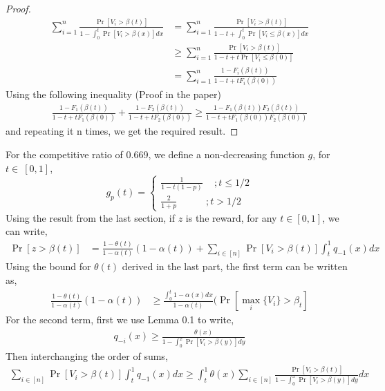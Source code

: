 \documentclass[10pt, letterpaper, twoside]{article}
\begin{document}
	\begin{proof}
		\begin{align*}
			\sum_{i=1}^{n} \frac{\Pr[V_{i}>\beta(t)]}{1-\int_{0}^{t} \Pr[V_{i}>\beta(x)] dx} &= \sum_{i=1}^{n} \frac{\Pr[V_{i}>\beta(t)]}{1-t+\int_{0}^{t} \Pr[V_{i}\leq\beta(x)] dx}\\
			&\geq \sum_{i=1}^{n} \frac{\Pr[V_{i}>\beta(t)]}{1-t+t\Pr[V_{i}\leq\beta(0)]}\\
			&=\sum_{i=1}^{n} \frac{1-F_{i}(\beta(t))}{1-t+tF_{i}(\beta(0))}
		\end{align*}
		Using the following inequality	 (Proof in the paper)
		\begin{align*} 
			\frac{1-F_{1}(\beta(t))}{1-t+tF_{1}(\beta(0))} + \frac{1-F_{2}(\beta(t))}{1-t+tF_{2}(\beta(0))} \geq \frac{1-F_{1}(\beta(t))F_{2}(\beta(t))}{1-t+tF_{1}(\beta(0))F_{2}(\beta(0))} 
		\end{align*}  
		and repeating it n times, we get the required result.
	\end{proof}
	For the competitive ratio of 0.669, we define a non-decreasing function $g$, for $t \in\ [0,1]$,
	$$g_{p}(t) = \begin{cases}
	\frac{1}{1-t(1-p)}  \quad \,; t \leq 1/2 \\
	\frac{2}{1+p} \quad \quad \quad; t > 1/2
	\end{cases}
	$$
	Using the result from the last section, if $z$ is the reward, for any $t \in [0,1]$, we can write,\\
	\begin{align*}
		\Pr[z > \beta(t)] &= \frac{1-\theta(t)}{1-\alpha(t)} (1-\alpha(t)) + \sum_{i \in [n]} \Pr[V_{i} > \beta(t)] \int_{t}^{1} q_{-1}(x) dx
	\end{align*}
	Using the bound for $\theta(t)$ derived in the last part, the first term can be written as,
	\begin{align*}
		\frac{1-\theta(t)}{1-\alpha(t)} (1-\alpha(t)) &\geq \frac{\int_{0}^{t} 1 - \alpha(x) dx}{1-\alpha(t)} (\Pr[\max_{i} \{V_{i}\} > \beta_{t}]
	\end{align*}
	For the second term, first we use Lemma 0.1 to write,
	\begin{align*}
		q_{-i}(x) \geq \frac{\theta(x)}{1-\int_{0}^{x} \Pr[V_{i} > \beta(y)]  dy}
	\end{align*}
	Then interchanging the order of sums,
	\begin{align*}
		\sum_{i \in [n]} \Pr[V_{i} > \beta(t)] \int_{t}^{1} q_{-1}(x) dx \geq \int_{t}^{1} \theta(x) \sum_{i \in [n]} \frac{\Pr[V_{i} > \beta(t)]}{1 - \int_{0}^{x} \Pr[V_{i} > \beta(y)] dy} dx
	\end{align*}
\end{document}
